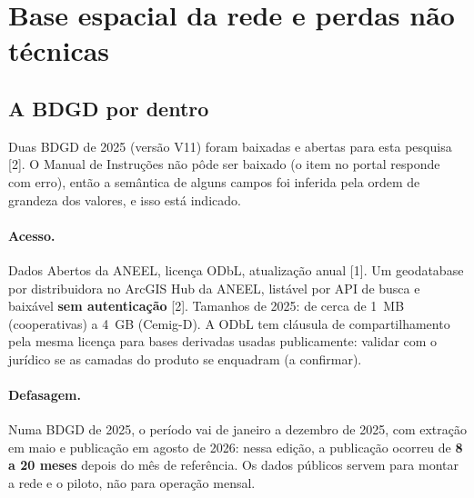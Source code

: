
\section{Base espacial da rede e perdas não técnicas}

\subsection*{A BDGD por dentro}

Duas BDGD de 2025 (versão V11) foram baixadas e abertas para esta pesquisa
[2]. O Manual de Instruções não pôde ser baixado (o item no portal responde
com erro), então a semântica de alguns campos foi inferida pela ordem de
grandeza dos valores, e isso está indicado.

\paragraph{Acesso.} Dados Abertos da ANEEL, licença ODbL, atualização anual
[1]. Um geodatabase por distribuidora no ArcGIS Hub da ANEEL, listável por
API de busca e baixável \textbf{sem autenticação} [2]. Tamanhos de 2025: de
cerca de 1~MB (cooperativas) a 4~GB (Cemig-D). A ODbL tem cláusula de
compartilhamento pela mesma licença para bases derivadas usadas publicamente:
validar com o jurídico se as camadas do produto se enquadram (a confirmar).

\paragraph{Defasagem.} Numa BDGD de 2025, o período vai de janeiro a
dezembro de 2025, com extração em maio e publicação em agosto de 2026: nessa
edição, a publicação ocorreu de \textbf{8 a 20 meses} depois do mês de
referência. Os dados públicos servem para
montar a rede e o piloto, não para operação mensal.


